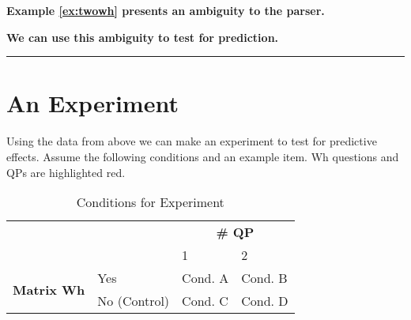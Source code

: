 \documentclass[12pt]{article}
\def\blank{\medskip\hrule\medskip}
\begin{document}
\begin{center}
    \textbf{Example \ref{ex:twowh} presents an ambiguity to the parser.}
\end{center}
\vspace{0.2cm}

\vspace{0.2cm}
\begin{center}
    \textbf{We can use this ambiguity to test for prediction.}
\end{center}

\blank
\newpage
\section{An Experiment}
Using the data from above we can make an experiment to test for predictive effects.
Assume the following conditions and an example item. Wh questions and QPs are highlighted red.

\begin{table}[H]
    \centering
    \begin{tabular}{cl|ll|}
    \cline{3-4}
    \multicolumn{1}{l}{}                               &      & \multicolumn{2}{c|}{\textbf{\# QP}} \\ \cline{3-4} 
    \textbf{}                                          &      & \multicolumn{1}{l|}{1}   & 2  \\ \hline
    \multicolumn{1}{|c|}{\multirow{2}{*}{\textbf{Matrix Wh}}} & Yes   & \multicolumn{1}{l|}{Cond. A }    & Cond. B    \\ \cline{2-4} 
    \multicolumn{1}{|c|}{}                             & No (Control) & \multicolumn{1}{l|}{Cond. C}    & Cond. D    \\ \hline
    \end{tabular}
    \caption{Conditions for Experiment}
    \label{table:exp2}
\end{table}
\end{document}
